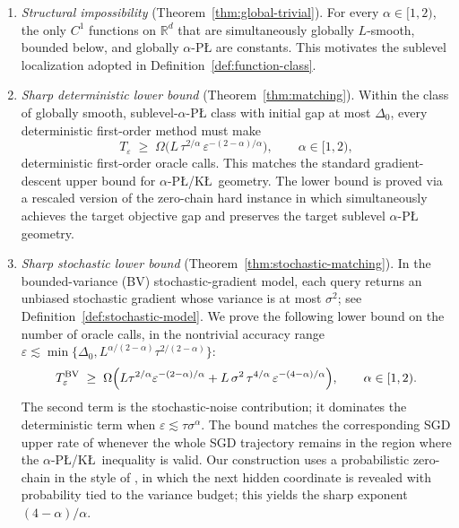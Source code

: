 \documentclass[11pt]{article}
\newcommand{\R}{\mathbb{R}}
\begin{document}
\begin{enumerate}[label={\bf (\arabic*)},leftmargin=2.3em,itemsep=0.5em,topsep=0.3em]

\item \emph{Structural impossibility} (Theorem~\ref{thm:global-trivial}). For every $\alpha\in[1,2)$, the only
$C^1$ functions on $\R^d$ that are simultaneously globally $L$-smooth, bounded below, and globally $\alpha$-P\L{} are
constants. This motivates the sublevel localization adopted in
Definition~\ref{def:function-class}.

\item \emph{Sharp deterministic lower bound} (Theorem~\ref{thm:matching}). Within the class of globally smooth,
sublevel-$\alpha$-P\L{} class with initial gap at most $\Delta_0$, every deterministic first-order method must make
\[
T_\varepsilon
\;\ge\;
\Omega\bigl(L\,\tau^{2/\alpha}\,\varepsilon^{-(2-\alpha)/\alpha}\bigr),
\qquad \alpha\in[1,2),
\] deterministic first-order oracle calls.
This matches the standard gradient-descent upper bound for $\alpha$-P\L{}/K\L\ geometry. The lower bound is proved via a
rescaled version of the zero-chain hard instance in \citet{YueFangLin2023} which simultaneously achieves the target objective gap and preserves the target sublevel
$\alpha$-P\L{} geometry.

\item \emph{Sharp stochastic lower bound} (Theorem~\ref{thm:stochastic-matching}). In the bounded-variance (BV)
stochastic-gradient model, each query returns an unbiased stochastic gradient whose variance is at most
\(\sigma^2\); see Definition~\ref{def:stochastic-model}. We prove the following lower bound on the number of oracle
calls, in the nontrivial accuracy range
\(\varepsilon\lesssim\min\{\Delta_0,L^{\alpha/(2-\alpha)}\tau^{2/(2-\alpha)}\}\):
\[
T_\varepsilon^{\mathrm{BV}}
\;\ge\;
\Omega\Bigl(
L\tau^{2/\alpha}\varepsilon^{-(2-\alpha)/\alpha}
 + L\,\sigma^2\,\tau^{4/\alpha}\,\varepsilon^{-(4-\alpha)/\alpha}
\Bigr),
\qquad \alpha\in[1,2).
\]
The second term is the stochastic-noise contribution; it dominates the deterministic term when
\(\varepsilon\lesssim\tau\sigma^\alpha\). The bound matches the corresponding SGD upper rate of
\citet{FatkhullinEtesamiHeKiyavash2022} whenever the whole SGD trajectory remains in the region where the
$\alpha$-P\L{}/K\L\ inequality is valid. Our construction uses a
probabilistic zero-chain in the style of
\citet{ArjevaniEtAl2019}, in which the next hidden coordinate is revealed with probability tied to the variance
budget; this yields the sharp exponent $(4-\alpha)/\alpha$.


\end{enumerate}
\end{document}
